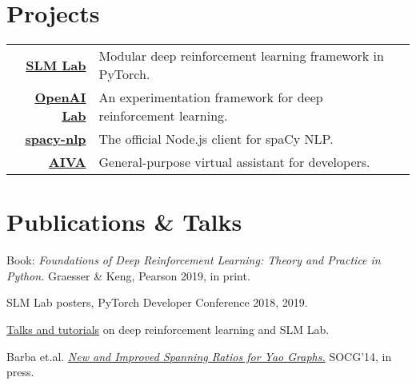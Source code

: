 \documentclass{deedy-resume-openfont}
\begin{document}
\begin{minipage}[t]{0.66\textwidth}

\section{Projects}
\begin{tabular}{rll}

\href{https://github.com/kengz/SLM-Lab}{\bf SLM Lab}  & Modular deep reinforcement learning framework in PyTorch.\\
\href{https://github.com/kengz/openai_lab}{\bf OpenAI Lab}  & An experimentation framework for deep reinforcement learning.\\
\href{https://github.com/kengz/spacy-nlp}{\bf spacy-nlp}  & The official Node.js client for spaCy NLP.\\
\href{https://github.com/kengz/aiva}{\bf AIVA}  & General-purpose virtual assistant for developers.\\
\end{tabular}
\sectionsep



\section{Publications \& Talks}
\begin{enumerate}[ {[}1{]} ]
\setlength{\itemsep}{0pt}
\setlength{\parskip}{0pt}

\item Book: {\em Foundations of Deep Reinforcement Learning: Theory and Practice in Python.} Graesser \& Keng, Pearson 2019, in print.
\item SLM Lab posters, PyTorch Developer Conference 2018, 2019.
\item \href{https://slm-lab.gitbook.io/slm-lab/publications-and-talks/talks-given-with-slm-lab}{Talks and tutorials} on deep reinforcement learning and SLM Lab.
\item Barba et.al. \href{http://arxiv.org/pdf/1307.5829.pdf}{\em New and Improved Spanning Ratios for Yao Graphs.} SOCG'14, in press.
\end{enumerate}
\sectionsep




\end{minipage}
\end{document}
